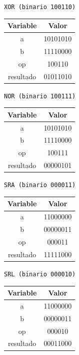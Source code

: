 \documentclass[letterpaper]{sae}
\begin{document}
\vspace{5 mm}

\verb+XOR (binario 100110)+\\

\begin{center}
	\begin{tabular}{|c|c|}
		\hline 
		Variable & Valor\tabularnewline
		\hline 
		\hline 
		a & 10101010\tabularnewline
		\hline 
		b & 11110000\tabularnewline
		\hline 
		op & 100110\tabularnewline
		\hline 
		resultado & 01011010\tabularnewline
		\hline 
	\end{tabular}
\end{center}

\vspace{5 mm}

\newpage

\verb+NOR (binario 100111)+\\

\begin{center}
	\begin{tabular}{|c|c|}
		\hline 
		Variable & Valor\tabularnewline
		\hline 
		\hline 
		a & 10101010\tabularnewline
		\hline 
		b & 11110000\tabularnewline
		\hline 
		op & 100111\tabularnewline
		\hline 
		resultado & 00000101\tabularnewline
		\hline 
	\end{tabular}
\end{center}

\vspace{5 mm}

\verb+SRA (binario 000011)+\\

\begin{center}
	\begin{tabular}{|c|c|}
		\hline 
		Variable & Valor\tabularnewline
		\hline 
		\hline 
		a & 11000000\tabularnewline
		\hline 
		b & 00000011\tabularnewline
		\hline 
		op & 000011\tabularnewline
		\hline 
		resultado & 11111000\tabularnewline
		\hline 
	\end{tabular}
\end{center}

\vspace{5 mm}

\verb+SRL (binario 000010)+\\

\begin{center}
	\begin{tabular}{|c|c|}
		\hline 
		Variable & Valor\tabularnewline
		\hline 
		\hline 
		a & 11000000\tabularnewline
		\hline 
		b & 00000011\tabularnewline
		\hline 
		op & 000010\tabularnewline
		\hline 
		resultado & 00011000\tabularnewline
		\hline 
	\end{tabular}
\end{center}
\end{document}
